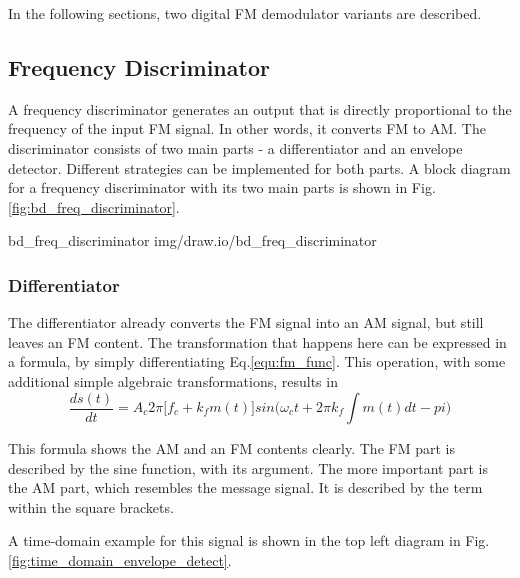 
In the following sections, two digital FM demodulator variants are described.


\subsection{Frequency Discriminator}

A frequency discriminator generates an output that is directly proportional to the frequency of the input FM signal.
In other words, it converts FM to AM.
The discriminator consists of two main parts - a differentiator and an envelope detector.
Different strategies can be implemented for both parts.
A block diagram for a frequency discriminator with its two main parts is shown in Fig.\ref{fig:bd_freq_discriminator}.

 {bd_freq_discriminator} {img/draw.io/bd_freq_discriminator}

\subsubsection{Differentiator}

The differentiator already converts the FM signal into an AM signal, but still leaves an FM content.
The transformation that happens here can be expressed in a formula, by simply differentiating Eq.\eqref{equ:fm_func}.
This operation, with some additional simple algebraic transformations, results in
\begin{equation}
  \frac{d s(t)}{dt} = A_c 2 \pi \Big[f_c + k_f m(t) \Big] sin \Big(\omega_c t + 2 \pi k_f \int m(t) dt -pi \Big)
  \label{equ:fm_demod_discriminator}
\end{equation}

This formula shows the AM and an FM contents clearly.
The FM part is described by the sine function, with its argument.
The more important part is the AM part, which resembles the message signal.
It is described by the term within the square brackets.

A time-domain example for this signal is shown in the top left diagram in Fig.\ref{fig:time_domain_envelope_detect}.\\

